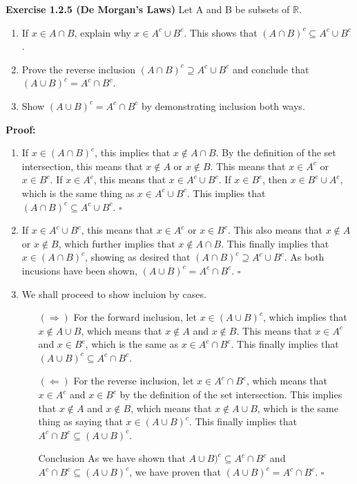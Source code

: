 \documentclass[12 pt]{article}
\newcommand{\qed}[0]{$\square$}
\begin{document}
 
\textbf{Exercise 1.2.5 (De Morgan's Laws)} Let A and B be subsets of \(\mathbb{R}\).

\begin{enumerate}
\item If \(x \in A \cap B\), explain why \(x \in A^{c} \cup B^{c}\). This shows that \((A \cap B)^{c} \subseteq A^{c} \cup B^{c}\).
\item Prove the reverse inclusion \((A \cap B)^{c} \supseteq A^{c} \cup B^{c}\) and conclude that \((A \cup B)^{c} = A^{c} \cap B^{c}\).
\item Show \((A \cup B)^{c} = A^{c} \cap B^{c}\) by demonstrating inclusion both ways.
\end{enumerate}

\vspace{5mm}
\textbf{Proof:}
\begin{enumerate}
\item If \(x \in (A \cap B)^{c}\), this implies that \(x \not \in A \cap B\). By the definition of the set intersection, this means that \(x \not \in A\) or \(x \not \in B\). This means that \(x \in A^{c}\) or \(x \in B^{c}\). If \(x \in A^{c}\), this means that \(x \in A^{c} \cup B^{c}\). If \(x \in B^{c}\), then \(x \in B^{c} \cup A^{c}\), which is the same thing as \(x \in  A^{c} \cup B^{c}\). This implies that \((A \cap B)^{c} \subseteq A^{c} \cup B^{c} \). \qed

\item If $x \in A^{c} \cup B^{c}$, this means that $x \in A^{c}$ or $x \in B^{c}$. This also means that $x \not \in  A$ or $x \not \in B$, which further implies that $x \not \in A \cap B$. This finally implies that $x \in (A \cap B)^{c}$, showing as desired that \((A \cap B)^{c} \supseteq A^{c} \cup B^{c}\). As both incusions have been shown, \((A \cup B)^{c} = A^{c} \cap B^{c}\). \qed

\item We shall proceed to show incluion by cases.
\begin{enumerate}
\item[\((\Rightarrow)\)] For the forward inclusion, let \(x \in (A \cup B)^{c}\), which implies that \(x \not \in A \cup B\), which means that \(x \not \in A\) and \(x \not \in B\). This means that \(x \in A^{c}\) and \(x \in B^{c}\), which is the same as \(x \in A^{c} \cap B^{c}\). This finally implies that \((A \cup B)^{c} \subseteq A^{c} \cap B^{c}\).

\item[\((\Leftarrow)\)] For the reverse inclusion, let \(x \in A^{c} \cap B^{c}\), which means that \(x \in A^{c}\) and \(x \in B^{c}\) by the definition of the set intersection. This implies that \(x \not \in A\) and \(x \not \in B\), which means that \(x \not \in A \cup B\), which is the same thing as saying that \(x \in (A \cup B)^{c}\). This finally implies that \(A^{c} \cap B^{c} \subseteq (A \cup B)^{c}\).
\item[Conclusion] As we have shown that \(A \cup B)^{c} \subseteq A^{c} \cap B^{c}\) and \(A^{c} \cap B^{c} \subseteq (A \cup B)^{c}\), we have proven that \((A \cup B)^{c} = A^{c} \cap B^{c}\). \qed
\end{enumerate}
\end{enumerate}
\end{document}
